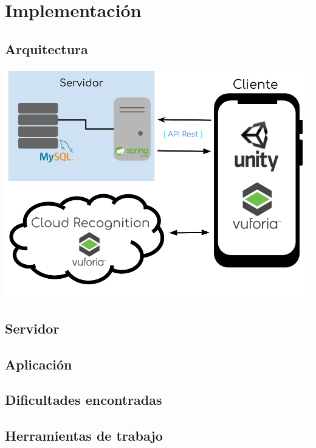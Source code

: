
\cleardoublepage


\chapter{Implementación}
\label{makereference4}

\section{Arquitectura}
\label{makereference4.1}
\includegraphics[scale=0.47]{figures/Arquitectura.png}

\section{Servidor}
\label{makereference4.2}

\section{Aplicación}
\label{makereference4.3}

\section{Dificultades encontradas}
\label{makereference4.4}

\section{Herramientas de trabajo}
\label{makereference4.5}

